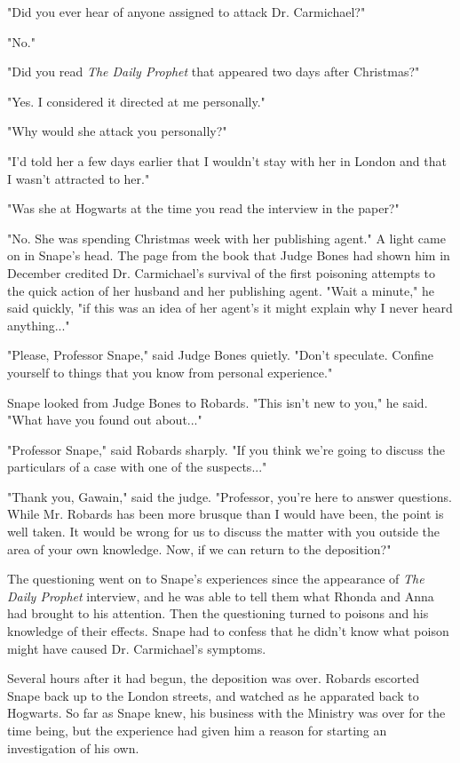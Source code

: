 \documentclass[a4paper,11pt]{article}
\begin{document}
"Did you ever hear of anyone assigned to attack Dr. Carmichael?"

"No."

"Did you read \emph{The Daily Prophet} that appeared two days after Christmas?"

"Yes. I considered it directed at me personally."

"Why would she attack you personally?"

"I'd told her a few days earlier that I wouldn't stay with her in London and that I wasn't attracted to her."

"Was she at Hogwarts at the time you read the interview in the paper?"

"No. She was spending Christmas week with her publishing agent." A light came on in Snape's head. The page from the book that Judge Bones had shown him in December credited Dr. Carmichael's survival of the first poisoning attempts to the quick action of her husband and her publishing agent. "Wait a minute," he said quickly, "if this was an idea of her agent's it might explain why I never heard anything..."

"Please, Professor Snape," said Judge Bones quietly. "Don't speculate. Confine yourself to things that you know from personal experience."

Snape looked from Judge Bones to Robards. "This isn't new to you," he said. "What have you found out about..."

"Professor Snape," said Robards sharply. "If you think we're going to discuss the particulars of a case with one of the suspects..."

"Thank you, Gawain," said the judge. "Professor, you're here to answer questions. While Mr. Robards has been more brusque than I would have been, the point is well taken. It would be wrong for us to discuss the matter with you outside the area of your own knowledge. Now, if we can return to the deposition?"

The questioning went on to Snape's experiences since the appearance of \emph{The Daily Prophet} interview, and he was able to tell them what Rhonda and Anna had brought to his attention. Then the questioning turned to poisons and his knowledge of their effects. Snape had to confess that he didn't know what poison might have caused Dr. Carmichael's symptoms.

Several hours after it had begun, the deposition was over. Robards escorted Snape back up to the London streets, and watched as he apparated back to Hogwarts. So far as Snape knew, his business with the Ministry was over for the time being, but the experience had given him a reason for starting an investigation of his own.
\end{document}
